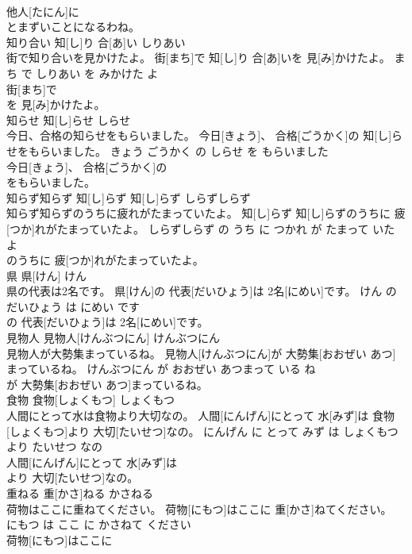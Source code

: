 \documentclass[8pt]{extreport}
\begin{document}
\begin{CJK}{UTF8}{min}
\\	他人[たにん]に
\\	とまずいことになるわね。			
\\	知り合い	知[し]り 合[あ]い	しりあい	
\\	街で知り合いを見かけたよ。	街[まち]で 知[し]り 合[あ]いを 見[み]かけたよ。	まち で しりあい を みかけた よ	
\\	街[まち]で
\\	を 見[み]かけたよ。			
\\	知らせ	知[し]らせ	しらせ	
\\	今日、合格の知らせをもらいました。	今日[きょう]、 合格[ごうかく]の 知[し]らせをもらいました。	きょう ごうかく の しらせ を もらいました	
\\	今日[きょう]、 合格[ごうかく]の
\\	をもらいました。			
\\	知らず知らず	知[し]らず 知[し]らず	しらずしらず	
\\	知らず知らずのうちに疲れがたまっていたよ。	知[し]らず 知[し]らずのうちに 疲[つか]れがたまっていたよ。	しらずしらず の うち に つかれ が たまって いた よ	
\\	のうちに 疲[つか]れがたまっていたよ。			
\\	県	県[けん]	けん	
\\	県の代表は2名です。	県[けん]の 代表[だいひょう]は 2名[にめい]です。	けん の だいひょう は にめい です	
\\	の 代表[だいひょう]は 2名[にめい]です。			
\\	見物人	見物人[けんぶつにん]	けんぶつにん	
\\	見物人が大勢集まっているね。	見物人[けんぶつにん]が 大勢集[おおぜい あつ]まっているね。	けんぶつにん が おおぜい あつまって いる ね	
\\	が 大勢集[おおぜい あつ]まっているね。			
\\	食物	食物[しょくもつ]	しょくもつ	
\\	人間にとって水は食物より大切なの。	人間[にんげん]にとって 水[みず]は 食物[しょくもつ]より 大切[たいせつ]なの。	にんげん に とって みず は しょくもつ より たいせつ なの	
\\	人間[にんげん]にとって 水[みず]は
\\	より 大切[たいせつ]なの。			
\\	重ねる	重[かさ]ねる	かさねる	
\\	荷物はここに重ねてください。	荷物[にもつ]はここに 重[かさ]ねてください。	にもつ は ここ に かさねて ください	
\\	荷物[にもつ]はここに

\end{CJK}
\end{document}
